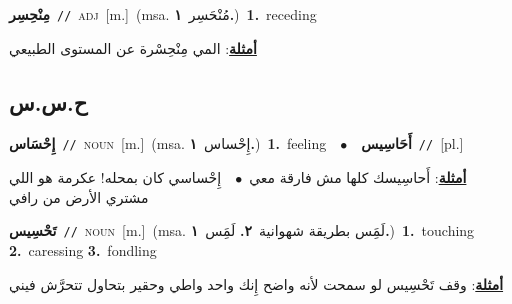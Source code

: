 \documentclass[10pt,a4paper,twoside]{article} %
\begin{document}
\begin{multicols}{2}
{\setlength\topsep{0pt}\textbf{\foreignlanguage{arabic}{مِنْحِسِر}}\ {\color{gray}\texttt{//}\color{black}}\ \textsc{adj}\ [m.]\ \color{gray}(msa. \foreignlanguage{arabic}{مُنْحَسِر}~\foreignlanguage{arabic}{\textbf{١.}})\color{black}\ \textbf{1.}~receding\  \begin{flushright}\color{gray}\foreignlanguage{arabic}{\textbf{\underline{\foreignlanguage{arabic}{أمثلة}}}: المي مِنْحِسْرة عن المستوى الطبيعي}\end{flushright}\color{black}} \vspace{2mm}

\vspace{-3mm}
\subsection*{\color{blue}\foreignlanguage{arabic}{ح.س.س}\color{blue}{}} 

{\setlength\topsep{0pt}\textbf{\foreignlanguage{arabic}{إِحْسَاس}}\ {\color{gray}\texttt{//}\color{black}}\ \textsc{noun}\ [m.]\ \color{gray}(msa. \foreignlanguage{arabic}{إِحْساس}~\foreignlanguage{arabic}{\textbf{١.}})\color{black}\ \textbf{1.}~feeling\ \ $\bullet$\ \ \setlength\topsep{0pt}\textbf{\foreignlanguage{arabic}{أَحَاسِيس}}\ {\color{gray}\texttt{//}\color{black}}\ [pl.]\  \begin{flushright}\color{gray}\foreignlanguage{arabic}{\textbf{\underline{\foreignlanguage{arabic}{أمثلة}}}: أَحاسِيسك كلها مش فارقة معي\ $\bullet$\ \  إِحْساسي كان بمحله! عكرمة هو اللي مشتري الأرض من رافي}\end{flushright}\color{black}} \vspace{2mm}

{\setlength\topsep{0pt}\textbf{\foreignlanguage{arabic}{تَحْسِيس}}\ {\color{gray}\texttt{//}\color{black}}\ \textsc{noun}\ [m.]\ \color{gray}(msa. \foreignlanguage{arabic}{لَمَِس بطريقة شهوانية}~\foreignlanguage{arabic}{\textbf{٢.}}  \foreignlanguage{arabic}{لَمَِس}~\foreignlanguage{arabic}{\textbf{١.}})\color{black}\ \textbf{1.}~touching  \textbf{2.}~caressing  \textbf{3.}~fondling\  \begin{flushright}\color{gray}\foreignlanguage{arabic}{\textbf{\underline{\foreignlanguage{arabic}{أمثلة}}}: وقف تَحْسِيس لو سمحت لأنه واضح إِنك واحد واطي وحقير بتحاول تتحرَّش فيني}\end{flushright}\color{black}} \vspace{2mm}


\end{multicols}
\end{document}
